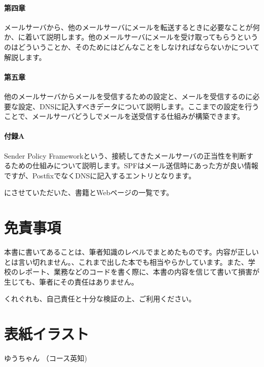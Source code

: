 \paragraph{第四章}
メールサーバから、他のメールサーバにメールを転送するときに必要なことが何か、に着いて説明します。他のメールサーバにメールを受け取ってもらうというのはどういうことか、そのためにはどんなことをしなければならないかについて解説します。

\paragraph{第五章}
他のメールサーバからメールを受信するための設定と、メールを受信するのに必要な設定、DNSに記入すべきデータについて説明します。ここまでの設定を行うことで、メールサーバどうしでメールを送受信する仕組みが構築できます。

\paragraph{付録A}
Sender Policy Frameworkという、接続してきたメールサーバの正当性を判断するための仕組みについて説明します。SPFはメール送信時にあった方が良い情報ですが、PostfixでなくDNSに記入するエントリとなります。


にさせていただいた、書籍とWebページの一覧です。

\section*{免責事項}
本書に書いてあることは、筆者知識のレベルでまとめたものです。内容が正しいとは言い切れません。、これまで出した本でも相当やらかしています。また、学校のレポート、業務などのコードを書く際に、本書の内容を信じて書いて損害が生じても、筆者にその責任はありません。

くれぐれも、自己責任と十分な検証の上、ご利用ください。

\section*{表紙イラスト}
ゆうちゃん （コース英知)